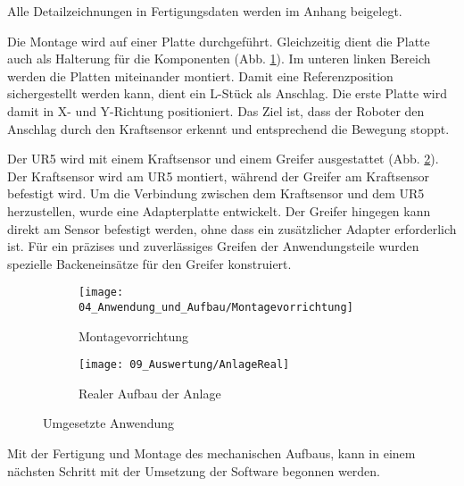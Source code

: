 	\begin{bfhNoteBox}
		Alle Detailzeichnungen in Fertigungsdaten werden im Anhang beigelegt. 
	\end{bfhNoteBox}	
	
	\vspace{5mm} 

	Die Montage wird auf einer Platte durchgeführt. Gleichzeitig dient die Platte auch als Halterung für die Komponenten (Abb. \ref{fig:Montagevorrichtung}). Im unteren linken Bereich werden die Platten miteinander montiert. Damit eine Referenzposition sichergestellt werden kann, dient ein L-Stück als Anschlag. Die erste Platte wird damit in X- und Y-Richtung positioniert. Das Ziel ist, dass der Roboter den Anschlag durch den Kraftsensor erkennt und entsprechend die Bewegung stoppt.
	
	\newpage
	
	Der UR5 wird mit einem Kraftsensor und einem Greifer ausgestattet (Abb. \ref{fig:AnlageReal}). Der Kraftsensor wird am UR5 montiert, während der Greifer am Kraftsensor befestigt wird. Um die Verbindung zwischen dem Kraftsensor und dem UR5 herzustellen, wurde eine Adapterplatte entwickelt. Der Greifer hingegen kann direkt am Sensor befestigt werden, ohne dass ein zusätzlicher Adapter erforderlich ist. Für ein präzises und zuverlässiges Greifen der Anwendungsteile wurden spezielle Backeneinsätze für den Greifer konstruiert.
	
	 \begin{figure}[h!]
		\centering
		\begin{subfigure}[b]{0.6\textwidth}
			\centering
			\texttt{[image: 04\_Anwendung\_und\_Aufbau/Montagevorrichtung]}
			\caption{Montagevorrichtung}
			\label{fig:Montagevorrichtung}
		\end{subfigure}
		\hfill
		\begin{subfigure}[b]{0.35\textwidth}
			\centering
			\texttt{[image: 09\_Auswertung/AnlageReal]}
			\caption{Realer Aufbau der Anlage}
			\label{fig:AnlageReal}
		\end{subfigure}
		\caption{Umgesetzte Anwendung}
		\label{fig:AnwendungUmgesetzt}
	\end{figure}
	
	Mit der Fertigung und Montage des mechanischen Aufbaus, kann in einem nächsten Schritt mit der Umsetzung der Software begonnen werden. 

	
	
